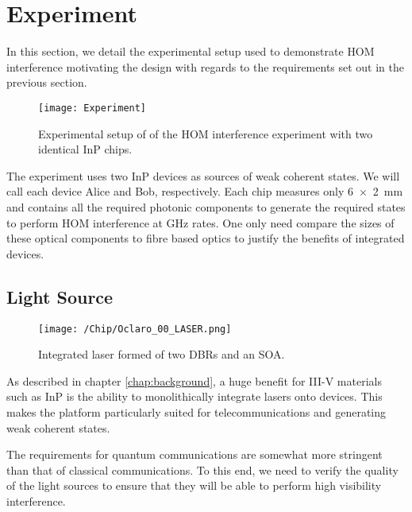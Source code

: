 \section{Experiment}

In this section, we detail the experimental setup used to demonstrate \ac{HOM} interference motivating the design with regards to the requirements set out in the previous section. 

\begin{figure}[tbp]
	\centering
	\texttt{[image: Experiment]}
	\caption[HOM experimental setup]{Experimental setup of of the \ac{HOM} interference experiment with two identical \ac{InP} chips.}
	\label{fig:hom_experiment}
\end{figure}

The experiment uses two \ac{InP} devices as sources of weak coherent states. We will call each device Alice and Bob, respectively. Each chip measures only \SI[product-units=power]{6x2}{mm} and contains all the required photonic components to generate the required states to perform \ac{HOM} interference at GHz rates. One only need compare the sizes of these optical components to fibre based optics to justify the benefits of integrated devices.

\subsection{Light Source}

\begin{figure}
	\centering
	\texttt{[image: /Chip/Oclaro\_00\_LASER.png]}
	\caption{Integrated laser formed of two DBRs and an SOA.}
	\label{fig:InP_laser}
\end{figure}

As described in chapter \ref{chap:background}, a huge benefit for III-V materials such as \ac{InP} is the ability to monolithically integrate lasers onto devices. This makes the platform particularly suited for telecommunications and generating weak coherent states. 

The requirements for quantum communications are somewhat more stringent than that of classical communications. To this end, we need to verify the quality of the light sources to ensure that they will be able to perform high visibility interference. 

